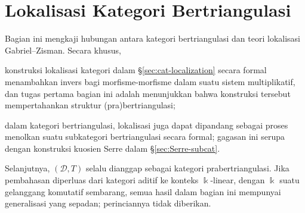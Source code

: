 
\section{Lokalisasi Kategori Bertriangulasi}\label{sec:triangulated-localization}
\hypertarget{o014.aljabr2.chapter4.triangulated-localization}{ }

Bagian ini mengkaji hubungan antara kategori bertriangulasi dan teori
lokalisasi Gabriel--Zisman. Secara khusus,
\begin{compactitem}
	\item konstruksi lokalisasi kategori dalam \S\ref{sec:cat-localization}
	secara formal menambahkan invers bagi morfisme-morfisme dalam suatu sistem
	multiplikatif, dan tugas pertama bagian ini adalah menunjukkan bahwa
	konstruksi tersebut mempertahankan struktur (pra)bertriangulasi;
	\item dalam kategori bertriangulasi, lokalisasi juga dapat dipandang sebagai
	proses menolkan suatu subkategori bertriangulasi secara formal; gagasan ini
	serupa dengan konstruksi kuosien Serre dalam \S\ref{sec:Serre-subcat}.
\end{compactitem}

Selanjutnya, $(\mathcal{D}, T)$ selalu dianggap sebagai kategori
prabertriangulasi. Jika pembahasan diperluas dari kategori aditif ke konteks
$\Bbbk$-linear,
	dengan $\Bbbk$ suatu gelanggang komutatif sembarang, semua hasil dalam bagian
	ini mempunyai generalisasi yang sepadan; perinciannya tidak diberikan.

